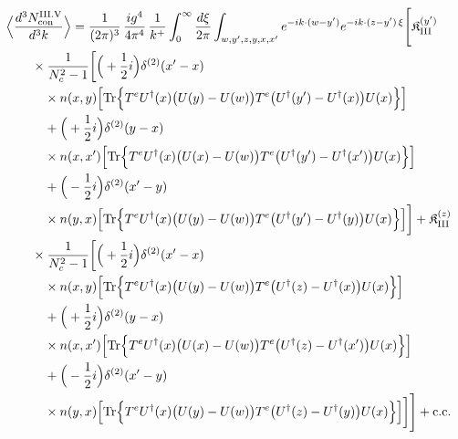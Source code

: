 \begin{align}\label{eq:S-III.V-2}
&\Big\langle\frac{d^{3}N^{\rm III.V}_{{\rm con}}}{d^{3}k}\Big\rangle=\frac{1}{(2\pi)^{3}}\, \frac{ig^{4}}{4\pi^{4}}\, \frac{1}{k^{+}} \int_{0}^{\infty}\frac{d\xi}{2\pi} \int_{w,y',z,y,x,x'}e^{-ik\cdot(w-y')}e^{-ik\cdot(z-y')\,\xi}\Bigg[ \mathfrak{K}^{(y')}_{\rm III}\notag\\
&\quad\quad \times \frac{1}{N_{c}^{2}-1}\bigg[\Big(+\frac{1}{2}i\Big)\delta^{(2)}(x'-x)\notag\\
&\quad\quad\quad \times n(x,y)\Big[{\rm Tr}\Big\{T^{e}U^{\dagger}(x)\big(U(y)-U(w)\big)T^{e}\big(U^{\dagger}(y')-U^{\dagger}(x)\big)U(x)\Big\}\Big]\notag\\
&\quad\quad\quad +\Big(+\frac{1}{2}i\Big)\delta^{(2)}(y-x)\notag\\
&\quad\quad\quad \times n(x,x')\Big[{\rm Tr}\Big\{T^{e}U^{\dagger}(x)\big(U(x)-U(w)\big)T^{e}\big(U^{\dagger}(y')-U^{\dagger}(x')\big)U(x)\Big\}\Big]\notag\\
&\quad\quad\quad +\Big(-\frac{1}{2}i\Big)\delta^{(2)}(x'-y)\notag\\
&\quad\quad\quad \times n(y,x)\Big[{\rm Tr}\Big\{T^{e}U^{\dagger}(x)\big(U(y)-U(w)\big)T^{e}\big(U^{\dagger}(y')-U^{\dagger}(y)\big)U(x)\Big\}\Big]\bigg] + \mathfrak{K}^{(z)}_{\rm III}\notag\\
&\quad\quad \times \frac{1}{N_{c}^{2}-1}\bigg[\Big(+\frac{1}{2}i\Big)\delta^{(2)}(x'-x)\notag\\
&\quad\quad\quad \times n(x,y)\Big[{\rm Tr}\Big\{T^{e}U^{\dagger}(x)\big(U(y)-U(w)\big)T^{e}\big(U^{\dagger}(z)-U^{\dagger}(x)\big)U(x)\Big\}\Big]\notag\\
&\quad\quad\quad +\Big(+\frac{1}{2}i\Big)\delta^{(2)}(y-x)\notag\\
&\quad\quad\quad \times n(x,x')\Big[{\rm Tr}\Big\{T^{e}U^{\dagger}(x)\big(U(x)-U(w)\big)T^{e}\big(U^{\dagger}(z)-U^{\dagger}(x')\big)U(x)\Big\}\Big]\notag\\
&\quad\quad\quad +\Big(-\frac{1}{2}i\Big)\delta^{(2)}(x'-y)\notag\\
&\quad\quad\quad \times n(y,x)\Big[{\rm Tr}\Big\{T^{e}U^{\dagger}(x)\big(U(y)-U(w)\big)T^{e}\big(U^{\dagger}(z)-U^{\dagger}(y)\big)U(x)\Big\}\Big]\bigg]\Bigg] +{\rm c.c.}
\end{align}

